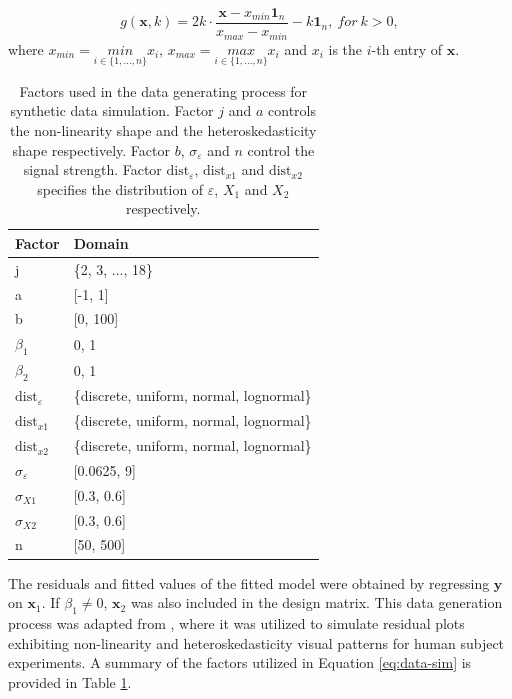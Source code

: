 \documentclass[]{interact}
\theoremstyle{plain}%
\theoremstyle{definition}
\theoremstyle{remark}
\begin{document}
\[g(\boldsymbol{x}, k) = 2k \cdot \frac{\boldsymbol{x} - x_{min}\boldsymbol{1}_n}{x_{max} - x_{min}} - k\boldsymbol{1}_n,~for~k > 0,\]
\noindent where \(x_{min} = \underset{i \in \{ 1,...,n\}}{min} x_i\),
\(x_{max} = \underset{i \in \{ 1,...,n\}}{max} x_i\) and \(x_i\) is the
\(i\)-th entry of \(\boldsymbol{x}\).

\begin{table}

\caption{\label{tab:factor}Factors used in the data generating process for synthetic data simulation. Factor $j$ and $a$ controls the non-linearity shape and the heteroskedasticity shape respectively. Factor $b$, $\sigma_\varepsilon$ and $n$ control the signal strength. Factor $\text{dist}_\varepsilon$, $\text{dist}_{x1}$ and $\text{dist}_{x2}$ specifies the distribution of $\varepsilon$, $X_1$ and $X_2$ respectively.}
\centering
\begin{tabular}[t]{ll}
\toprule
Factor & Domain\\
\midrule
j & \{2, 3, ..., 18\}\\
a & {}[-1, 1]\\
b & {}[0, 100]\\
$\beta_1$ & {0, 1}\\
$\beta_2$ & {0, 1}\\
\addlinespace
$\text{dist}_\varepsilon$ & \{discrete, uniform, normal, lognormal\}\\
$\text{dist}_{x1}$ & \{discrete, uniform, normal, lognormal\}\\
$\text{dist}_{x2}$ & \{discrete, uniform, normal, lognormal\}\\
$\sigma_{\varepsilon}$ & {}[0.0625, 9]\\
$\sigma_{X1}$ & {}[0.3, 0.6]\\
\addlinespace
$\sigma_{X2}$ & {}[0.3, 0.6]\\
n & {}[50, 500]\\
\bottomrule
\end{tabular}
\end{table}

The residuals and fitted values of the fitted model were obtained by
regressing \(\boldsymbol{y}\) on \(\boldsymbol{x}_1\). If
\(\beta_1 \neq 0\), \(\boldsymbol{x}_2\) was also included in the design
matrix. This data generation process was adapted from
\citet{li2023plot}, where it was utilized to simulate residual plots
exhibiting non-linearity and heteroskedasticity visual patterns for
human subject experiments. A summary of the factors utilized in Equation
\ref{eq:data-sim} is provided in Table \ref{tab:factor}.
\end{document}
